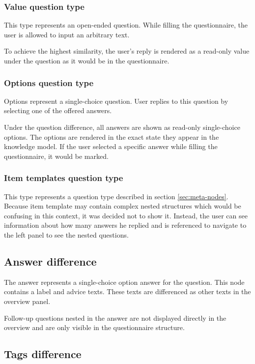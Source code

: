 \subsubsection*{Value question type}

This type represents an open-ended question.
While filling the questionnaire, the user is allowed to input an arbitrary text.

To achieve the highest similarity, the user's reply is rendered as a read-only value under the question as it would be in the questionnaire.

\subsubsection*{Options question type}

Options represent a single-choice question.
User replies to this question by selecting one of the offered answers.

Under the question difference, all answers are shown as read-only single-choice options.
The options are rendered in the exact state they appear in the knowledge model.
If the user selected a specific answer while filling the questionnaire, it would be marked.

\subsubsection*{Item templates question type}

This type represents a question type described in section \ref{sec:meta-nodes}.
Because item template may contain complex nested structures which would be confusing in this context, it was decided not to show it.
Instead, the user can see information about how many answers he replied and is referenced to navigate to the left panel to see the nested questions.

\subsection{Answer difference}

The answer represents a single-choice option answer for the question.
This node contains a label and advice texts.
These texts are differenced as other texts in the overview panel.

Follow-up questions nested in the answer are not displayed directly in the overview and are only visible in the questionnaire structure.

\subsection{Tags difference}

